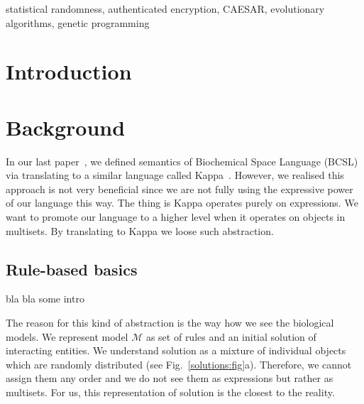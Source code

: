 \documentclass[12pt]{fithesis2}
\begin{document}
\begin{ThesisKeyWords}
statistical randomness, authenticated encryption, CAESAR, evolutionary algorithms, genetic programming
\end{ThesisKeyWords}

\MainMatter
\tableofcontents

\chapter{Introduction}

\chapter{Background}

In our last paper~\cite{Ded201627}, we defined semantics of Biochemical Space Language (BCSL) via translating to a similar language called Kappa~\cite{Kappa}. However, we realised this approach is not very beneficial since we are not fully using the expressive power of our language this way. The thing is Kappa operates purely on expressions. We want to promote our language to a higher level when it operates on objects in multisets. By translating to Kappa we loose such abstraction. 

\section{Rule-based basics}
\label{Rule-based basics}

bla bla some intro

The reason for this kind of abstraction is the way how we see the biological models. We represent model $\mathcal{M}$ as set of rules and an initial solution of interacting entities. We understand solution as a mixture of individual objects which are randomly distributed (see Fig.~\ref{solutions:fig}a). Therefore, we cannot assign them any order and we do not see them as expressions but rather as multisets. For us, this representation of solution is the closest to the reality.
\end{document}
